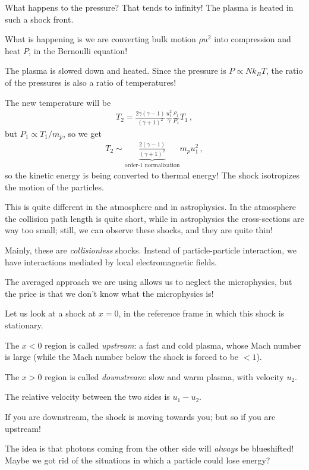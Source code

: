 \documentclass[main.tex]{subfiles}
\begin{document}
What happens to the pressure? That tends to infinity! 
The plasma is heated in such a shock front. 

What is happening is we are converting bulk motion \(\rho u^2\) into compression and heat \(P\), in the Bernoulli equation!

The plasma is slowed down and heated. Since the pressure is \(P \propto N k_B T\), the ratio of the pressures is also a ratio of temperatures! 

The new temperature will be 
%
\begin{align}
T_2 = \frac{2 \gamma (\gamma - 1)}{(\gamma + 1)^2} \frac{u_1^2}{\gamma} \frac{\rho_1}{P_1} T_1 
\,,
\end{align}
%
but \(P_1 \propto T_1 / m_p\), so we get 
%
\begin{align}
T_2 \sim \underbrace{\frac{2 (\gamma - 1)}{(\gamma + 1)^2}}_{\text{order-1 normalization}} m_p u_1^2
\,,
\end{align}
%
so the kinetic energy is being converted to thermal energy! 
The shock isotropizes the motion of the particles. 

This is quite different in the atmosphere and in astrophysics. 
In the atmosphere the collision path length is quite short, while in astrophysics the cross-sections are way too small; still, we can observe these shocks, and they are quite thin! 

Mainly, these are \emph{collisionless} shocks. 
Instead of particle-particle interaction, we have interactions mediated by local electromagnetic fields. 

The averaged approach we are using allows us to neglect the microphysics, but the price is that we don't know what the microphysics is! 

Let us look at a shock at \(x = 0\), in the reference frame in which this shock is stationary. 

The \(x< 0\) region is called \emph{upstream}: a fast and cold plasma, whose Mach number is large (while the Mach number below the shock is forced to be \(< 1\)). 

The \(x > 0\) region is called \emph{downstream}: slow and warm plasma, with velocity \(u_2\).

The relative velocity between the two sides is \(u_1 - u_2 \). 

If you are downstream, the shock is moving towards you; but so if you are upstream! 

The idea is that photons coming from the other side will \emph{always} be blueshifted! 
Maybe we got rid of the situations in which a particle could lose energy?
\end{document}
